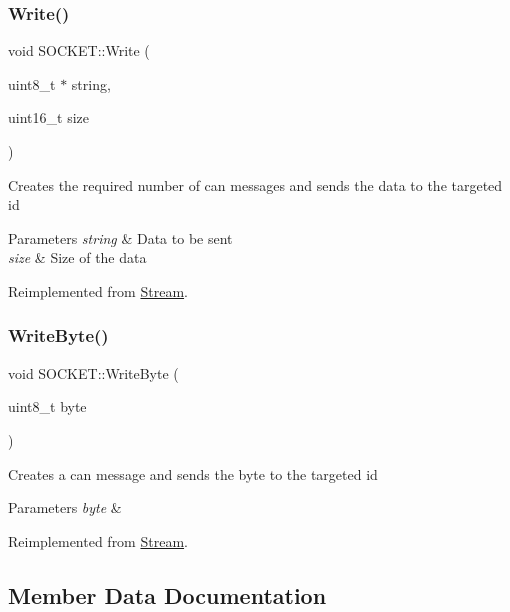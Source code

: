 \subsubsection{\texorpdfstring{Write()}{Write()}}
{\footnotesize\ttfamily void S\+O\+C\+K\+E\+T\+::\+Write (\begin{DoxyParamCaption}\item[{uint8\+\_\+t $\ast$}]{string,  }\item[{uint16\+\_\+t}]{size }\end{DoxyParamCaption})\hspace{0.3cm}{\ttfamily [virtual]}}

Creates the required number of can messages and sends the data to the targeted id 
\begin{DoxyParams}{Parameters}
{\em string} & Data to be sent \\
\hline
{\em size} & Size of the data \\
\hline
\end{DoxyParams}


Reimplemented from \hyperlink{class_stream_a508be3423e4d99ab2757275fb723002a}{Stream}.

\hypertarget{class_s_o_c_k_e_t_abcddb460b7adf3595a813f08f3659356}{}\label{class_s_o_c_k_e_t_abcddb460b7adf3595a813f08f3659356} 
\subsubsection{\texorpdfstring{Write\+Byte()}{WriteByte()}}
{\footnotesize\ttfamily void S\+O\+C\+K\+E\+T\+::\+Write\+Byte (\begin{DoxyParamCaption}\item[{uint8\+\_\+t}]{byte }\end{DoxyParamCaption})\hspace{0.3cm}{\ttfamily [virtual]}}

Creates a can message and sends the byte to the targeted id 
\begin{DoxyParams}{Parameters}
{\em byte} & \\
\hline
\end{DoxyParams}


Reimplemented from \hyperlink{class_stream_aeaed767b3a8d946c6f81465fa83ff17f}{Stream}.



\subsection{Member Data Documentation}
\hypertarget{class_s_o_c_k_e_t_a0755fe74751c2d94d3d1679cad9e6544}{}\label{class_s_o_c_k_e_t_a0755fe74751c2d94d3d1679cad9e6544} 
